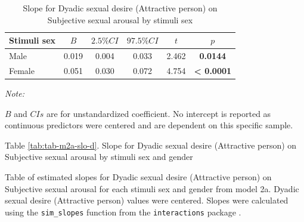 \documentclass[
  bookmarksnumbered]{article}
\begin{document}
\begin{table}[H]

\caption{\label{tab:tab-m2a-slo-del}Slope for Dyadic sexual desire (Attractive person) on 
        Subjective sexual arousal by stimuli sex}
\centering
\begin{threeparttable}
\begin{tabular}[t]{lccccc}
\toprule
Stimuli sex & $B$ & $2.5\% CI$ & $97.5\% CI$ & $t$ & $p$\\
\midrule
Male & 0.019 & 0.004 & 0.033 & 2.462 & \textbf{0.0144}\\
Female & 0.051 & 0.030 & 0.072 & 4.754 & \textbf{< 0.0001}\\
\bottomrule
\end{tabular}
\begin{tablenotes}[para]
\item \textit{Note: } 
\item $B$ and $CIs$ are for unstandardized coefficient.
           No intercept is reported as continuous predictors were centered
           and are dependent on this specific sample.
\end{tablenotes}
\end{threeparttable}
\end{table}

Table \ref{tab:tab-m2a-slo-d}. Slope for Dyadic sexual desire (Attractive person) on Subjective sexual arousal by stimuli sex and gender

Table of estimated slopes for Dyadic sexual desire (Attractive person) on Subjective sexual arousal for each stimuli sex and gender from model 2a. Dyadic sexual desire (Attractive person) values were centered. Slopes were calculated using the \texttt{sim\_slopes} function from the \texttt{interactions} package \autocite{interactionscit}.
\end{document}
